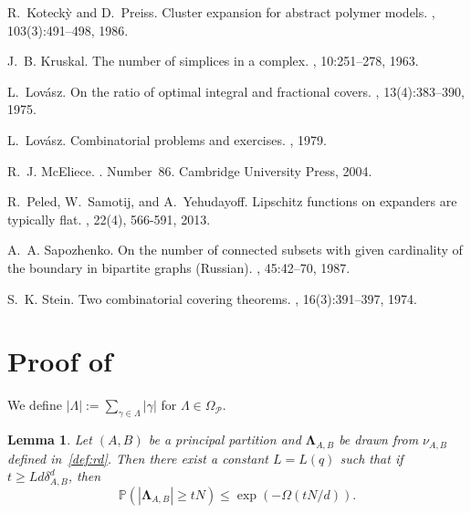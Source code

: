 \documentclass{amsart}
\newtheorem{lem}[thm]{Lemma}
\theoremstyle{definition}
\newcommand{\cP}{\mathcal{P} }
\newcommand{\0}[0]{\emptyset}
\newcommand{\pr}[0]{\mathbb{P}}
\begin{document}
\begin{thebibliography}{10}
R.~Koteck{\`y} and D.~Preiss.
\newblock Cluster expansion for abstract polymer models.
, 103(3):491--498, 1986.

J.~B. Kruskal.
\newblock The number of simplices in a complex.
, 10:251--278, 1963.

L.~Lov{\'a}sz.
\newblock On the ratio of optimal integral and fractional covers.
, 13(4):383--390, 1975.

L.~Lov{\'a}sz.
\newblock Combinatorial problems and exercises.
, 1979.

R.~J. McEliece.
.
\newblock Number~86. Cambridge University Press, 2004.

R.~Peled, W.~Samotij, and A.~Yehudayoff.
\newblock Lipschitz functions on expanders are typically flat.
, 22(4), 566-591, 2013.

A.~A. Sapozhenko.
\newblock On the number of connected subsets with given cardinality of the
  boundary in bipartite graphs ({R}ussian).
, 45:42--70, 1987.

S.~K. Stein.
\newblock Two combinatorial covering theorems.
, 16(3):391--397,
  1974.

\end{thebibliography}


\appendix



\section{Proof of }\label{appendix}

We define $|\Lambda|:=\sum_{\gamma\in\Lambda}|\gamma|$ for  $\Lambda\in\Omega_{\cP}$.

\begin{lem}\label{lem:defectsize}
Let $(A, B)$ be a principal partition and $\mathbf{\Lambda}_{A, B}$ be drawn from $\nu_{A, B}$ defined in~\eqref{def:rd}. Then there exist a constant $L=L(q)$ such that if $t\geq Ld\delta_{A, B}^d$, then 
\[
\pr(|\mathbf{\Lambda}_{A, B}|\geq tN)\leq \exp\left(-\Omega\left(tN/d\right)\right).
\]
\end{lem}
\end{document}
